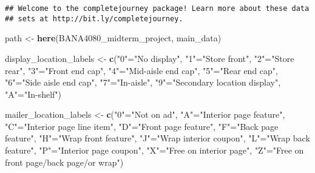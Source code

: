 \documentclass[
]{article}
\newenvironment{Shaded}{\begin{snugshade}}{\end{snugshade}}
\newcommand{\FunctionTok}[1]{\textcolor[rgb]{0.13,0.29,0.53}{\textbf{#1}}}
\newcommand{\NormalTok}[1]{#1}
\newcommand{\OtherTok}[1]{\textcolor[rgb]{0.56,0.35,0.01}{#1}}
\newcommand{\StringTok}[1]{\textcolor[rgb]{0.31,0.60,0.02}{#1}}
\begin{document}
\begin{verbatim}
## Welcome to the completejourney package! Learn more about these data
## sets at http://bit.ly/completejourney.
\end{verbatim}

\begin{Shaded}
\begin{Highlighting}[]
\NormalTok{path }\OtherTok{\textless{}{-}} \FunctionTok{here}\NormalTok{(}\StringTok{\textquotesingle{}BANA4080\_midterm\_project\textquotesingle{}}\NormalTok{, }\StringTok{\textquotesingle{}main\_data\textquotesingle{}}\NormalTok{)}

\NormalTok{display\_location\_labels }\OtherTok{\textless{}{-}} \FunctionTok{c}\NormalTok{(}\StringTok{"0"}\OtherTok{=}\StringTok{"No display"}\NormalTok{, }
                             \StringTok{"1"}\OtherTok{=}\StringTok{"Store front"}\NormalTok{, }
                             \StringTok{"2"}\OtherTok{=}\StringTok{"Store rear"}\NormalTok{, }
                             \StringTok{"3"}\OtherTok{=}\StringTok{"Front end cap"}\NormalTok{, }
                             \StringTok{"4"}\OtherTok{=}\StringTok{"Mid{-}aisle end cap"}\NormalTok{, }
                             \StringTok{"5"}\OtherTok{=}\StringTok{"Rear end cap"}\NormalTok{, }
                             \StringTok{"6"}\OtherTok{=}\StringTok{"Side aisle end cap"}\NormalTok{, }
                             \StringTok{"7"}\OtherTok{=}\StringTok{"In{-}aisle"}\NormalTok{, }
                             \StringTok{"9"}\OtherTok{=}\StringTok{"Secondary location display"}\NormalTok{, }
                             \StringTok{"A"}\OtherTok{=}\StringTok{"In{-}shelf"}\NormalTok{)}

\NormalTok{mailer\_location\_labels }\OtherTok{\textless{}{-}} \FunctionTok{c}\NormalTok{(}\StringTok{"0"}\OtherTok{=}\StringTok{"Not on ad"}\NormalTok{, }
                            \StringTok{"A"}\OtherTok{=}\StringTok{"Interior page feature"}\NormalTok{, }
                            \StringTok{"C"}\OtherTok{=}\StringTok{"Interior page line item"}\NormalTok{, }
                            \StringTok{"D"}\OtherTok{=}\StringTok{"Front page feature"}\NormalTok{, }
                            \StringTok{"F"}\OtherTok{=}\StringTok{"Back page feature"}\NormalTok{, }
                            \StringTok{"H"}\OtherTok{=}\StringTok{"Wrap front feature"}\NormalTok{, }
                            \StringTok{"J"}\OtherTok{=}\StringTok{"Wrap interior coupon"}\NormalTok{, }
                            \StringTok{"L"}\OtherTok{=}\StringTok{"Wrap back feature"}\NormalTok{, }
                            \StringTok{"P"}\OtherTok{=}\StringTok{"Interior page coupon"}\NormalTok{, }
                            \StringTok{"X"}\OtherTok{=}\StringTok{"Free on interior page"}\NormalTok{, }
                            \StringTok{"Z"}\OtherTok{=}\StringTok{"Free on front page/back page/or wrap"}\NormalTok{)}


\end{Highlighting}
\end{Shaded}
\end{document}
